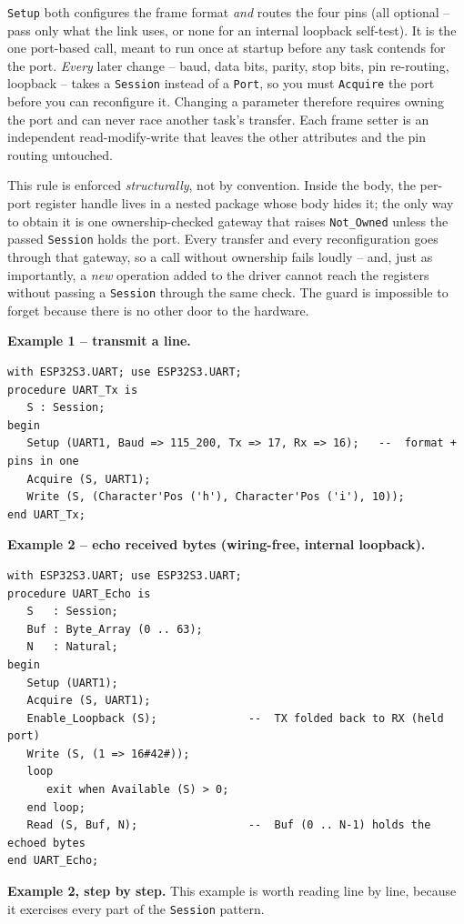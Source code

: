 \texttt{Setup} both configures the frame format \emph{and} routes the four pins
(all optional -- pass only what the link uses, or none for an internal loopback
self-test). It is the one port-based call, meant to run once at startup before
any task contends for the port. \emph{Every} later change -- baud, data bits,
parity, stop bits, pin re-routing, loopback -- takes a \texttt{Session} instead
of a \texttt{Port}, so you must \texttt{Acquire} the port before you can
reconfigure it. Changing a parameter therefore requires owning the port and can
never race another task's transfer. Each frame setter is an independent
read-modify-write that leaves the other attributes and the pin routing untouched.

This rule is enforced \emph{structurally}, not by convention. Inside the body,
the per-port register handle lives in a nested package whose body hides it; the
only way to obtain it is one ownership-checked gateway that raises
\texttt{Not\_Owned} unless the passed \texttt{Session} holds the port. Every
transfer and every reconfiguration goes through that gateway, so a call without
ownership fails loudly -- and, just as importantly, a \emph{new} operation
added to the driver cannot reach the registers without passing a \texttt{Session}
through the same check. The guard is impossible to forget because there is no
other door to the hardware.

\textbf{Example 1 -- transmit a line.}
\begin{lstlisting}
with ESP32S3.UART; use ESP32S3.UART;
procedure UART_Tx is
   S : Session;
begin
   Setup (UART1, Baud => 115_200, Tx => 17, Rx => 16);   --  format + pins in one
   Acquire (S, UART1);
   Write (S, (Character'Pos ('h'), Character'Pos ('i'), 10));
end UART_Tx;
\end{lstlisting}

\textbf{Example 2 -- echo received bytes (wiring-free, internal loopback).}
\begin{lstlisting}
with ESP32S3.UART; use ESP32S3.UART;
procedure UART_Echo is
   S   : Session;
   Buf : Byte_Array (0 .. 63);
   N   : Natural;
begin
   Setup (UART1);
   Acquire (S, UART1);
   Enable_Loopback (S);              --  TX folded back to RX (held port)
   Write (S, (1 => 16#42#));
   loop
      exit when Available (S) > 0;
   end loop;
   Read (S, Buf, N);                 --  Buf (0 .. N-1) holds the echoed bytes
end UART_Echo;
\end{lstlisting}

\textbf{Example 2, step by step.} This example is worth reading line by line,
because it exercises every part of the \texttt{Session} pattern.

